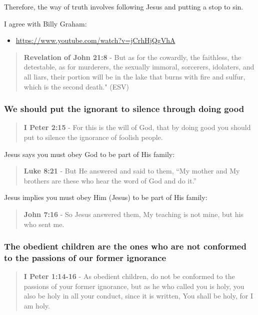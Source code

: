 \documentclass[11pt]{article}
\begin{document}
Therefore, the way of truth involves following Jesus and putting a stop to sin.

I agree with Billy Graham:
\begin{itemize}
\item \url{https://www.youtube.com/watch?v=jCrhHjQgVhA}
\end{itemize}

\begin{quote}
\textbf{Revelation of John 21:8} - But as for the cowardly, the faithless, the detestable, as for murderers, the sexually immoral, sorcerers, idolaters, and all liars, their portion will be in the lake that burns with fire and sulfur, which is the second death." (ESV)
\end{quote}

\subsubsection{We should put the ignorant to silence through doing good}
\label{sec:orga56e7fe}

\begin{quote}
\textbf{I Peter 2:15} - For this is the will of God, that by doing good you should put to silence the ignorance of foolish people.
\end{quote}

Jesus says you must obey God to be part of His family:

\begin{quote}
\textbf{Luke 8:21} - But He answered and said to them, “My mother and My brothers are these who hear the word of God and do it.”
\end{quote}

Jesus implies you must obey Him (Jesus) to be part of His family:

\begin{quote}
\textbf{John 7:16} - So Jesus answered them, My teaching is not mine, but his who sent me.
\end{quote}

\subsubsection{The obedient children are the ones who are not conformed to the passions of our former ignorance}
\label{sec:org1695539}
\begin{quote}
\textbf{I Peter 1:14-16} - As obedient children, do not be conformed to the passions of your former ignorance, but as he who called you is holy, you also be holy in all your conduct, since it is written, You shall be holy, for I am holy.
\end{quote}
\end{document}
